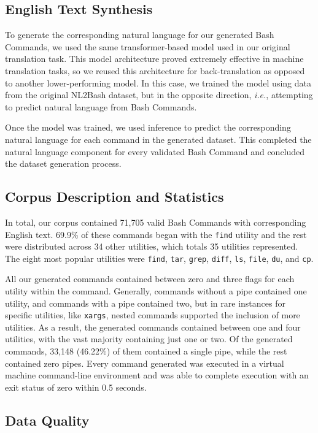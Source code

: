 \documentclass{river-journal}
\begin{document}
\subsection{English Text Synthesis}

To generate the corresponding natural language for our generated Bash Commands, we used the same transformer-based model used in our original translation task. This model architecture proved extremely effective in machine translation tasks, so we reused this architecture for back-translation as opposed to another lower-performing model. In this case, we trained the model using data from the original NL2Bash dataset, but in the opposite direction, {\em i.e.}, attempting to predict natural language from Bash Commands. 

Once the model was trained, we used inference to predict the corresponding natural language for each command in the generated dataset. This completed the natural language component for every validated Bash Command and concluded the dataset generation process.

\subsection{Corpus Description and Statistics}

In total, our corpus contained 71,705 valid Bash Commands with corresponding English text. 69.9\% of these commands began with the \texttt{find} utility and the rest were distributed across 34 other utilities, which totals 35 utilities represented. The eight most popular utilities were \texttt{find}, \texttt{tar}, \texttt{grep}, \texttt{diff}, \texttt{ls}, \texttt{file}, \texttt{du}, and \texttt{cp}.

All our generated commands contained between zero and three flags for each utility within the command. Generally, commands without a pipe contained one utility, and commands with a pipe contained two, but in rare instances for specific utilities, like \texttt{xargs}, nested commands supported the inclusion of more utilities. As a result, the generated commands contained between one and four utilities, with the vast majority containing just one or two. Of the generated commands, 33,148 (46.22\%) of them contained a single pipe, while the rest contained zero pipes. Every  command generated was executed in a virtual machine command-line environment and was able to complete execution with an exit status of zero within 0.5 seconds.

\subsection{Data Quality}
\end{document}
